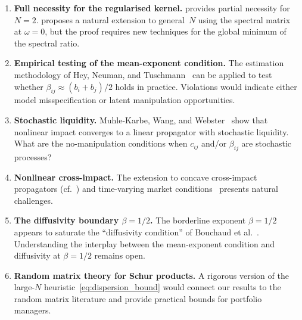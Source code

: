 \documentclass[12pt]{article}
\theoremstyle{definition}
\theoremstyle{remark}
\begin{document}
\begin{enumerate}[nosep]
\item \textbf{Full necessity for the regularised kernel.}
   provides partial necessity for $N=2$.
   proposes a natural extension to general~$N$
  using the spectral matrix at $\omega=0$, but the proof requires new
  techniques for the global minimum of the spectral ratio.

\item \textbf{Empirical testing of the mean-exponent condition.}
  The estimation methodology of Hey, Neuman, and
  Tuschmann~\cite{HeyNeumanTuschmann2025} can be applied to test whether
  $\beta_{ij}\approx(b_i+b_j)/2$ holds in practice.  Violations would
  indicate either model misspecification or latent manipulation opportunities.

\item \textbf{Stochastic liquidity.}
  Muhle-Karbe, Wang, and Webster~\cite{MuhleKarbeWangWebster2024} show that
  nonlinear impact converges to a linear propagator with stochastic liquidity.
  What are the no-manipulation conditions when $c_{ij}$ and/or $\beta_{ij}$
  are stochastic processes?

\item \textbf{Nonlinear cross-impact.}
  The extension to concave cross-impact propagators
  (cf.~\cite{HeyMastromatteoMuhleKarbe2024}) and time-varying market
  conditions~\cite{PalmariLilloEisler2024} presents natural challenges.

\item \textbf{The diffusivity boundary $\beta=1/2$.}
  The borderline exponent $\beta=1/2$ appears to saturate the ``diffusivity
  condition'' of Bouchaud et al.~\cite{Bouchaud2004,MLKB2026}.
  Understanding the interplay between the mean-exponent condition and
  diffusivity at $\beta=1/2$ remains open.

\item \textbf{Random matrix theory for Schur products.}
  A rigorous version of the large-$N$ heuristic~\eqref{eq:dispersion_bound}
  would connect our results to the random matrix literature and provide
  practical bounds for portfolio managers.
\end{enumerate}


\end{document}
